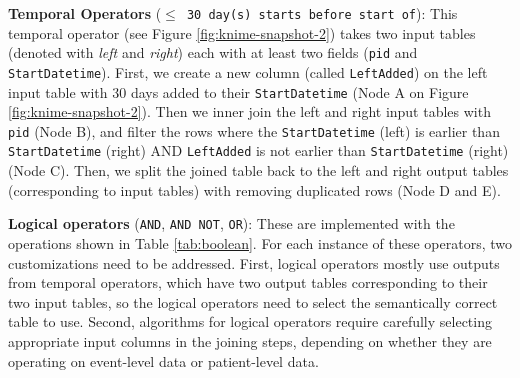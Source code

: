 \documentclass{article}
\begin{document}
\textbf{Temporal Operators} (\texttt{$\leq$ 30 day(s) starts before start of}): This temporal operator (see Figure \ref{fig:knime-snapshot-2}) takes two input tables (denoted with \emph{left} and \emph{right}) each with at least two fields (\texttt{pid} and \texttt{StartDatetime}). First, we create a new column (called \texttt{LeftAdded}) on the left input table with 30 days added to their \texttt{StartDatetime} (Node A on Figure \ref{fig:knime-snapshot-2}). Then we inner join the left and right input tables with \texttt{pid} (Node B), and filter the rows where the \texttt{StartDatetime} (left) is earlier than \texttt{StartDatetime} (right) AND \texttt{LeftAdded} is not earlier than \texttt{StartDatetime} (right) (Node C). Then, we split the joined table back to the left and right output tables (corresponding to input tables) with removing duplicated rows (Node D and E). 

\textbf{Logical operators} (\texttt{AND}, \texttt{AND NOT}, \texttt{OR}): These are implemented with the operations shown in Table \ref{tab:boolean}.  For each instance of these operators, two customizations need to be addressed.  First, logical operators mostly use outputs from temporal operators, which have two output tables corresponding to their two input tables, so the logical operators need to select the semantically correct table to use.  Second, algorithms for logical operators require carefully selecting appropriate input columns in the joining steps, depending on whether they are operating on event-level data or patient-level data.  
\end{document}
